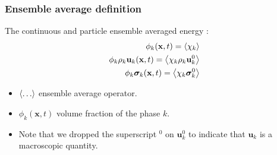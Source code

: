 \documentclass{sintefbeamer}
\begin{document}
\begin{frame}
  \frametitle{Ensemble average definition}
The continuous and particle ensemble  averaged energy : 
\begin{align*}
  \phi_k (\textbf{x},t) = \left<\chi_k \right>\\
  \phi_k \rho_k  \textbf{u}_k (\textbf{x},t) = \left<\chi_k \rho_k \textbf{u}_k^0 \right>\\
  \phi_k \bm\sigma_k (\textbf{x},t) = \left<\chi_k \bm\sigma_k^0 \right>\\
  \label{eq:1_avg}
\end{align*}
\begin{definition}
  \begin{itemize}
    \item $\left<\ldots\right>$ ensemble average operator. 
    \item  $\phi_k (\textbf{x},t)$ volume fraction of the phase $k$. 
    \item Note that we dropped the superscript $^0$ on $\textbf{u}^0_k$ to indicate that $\textbf{u}_k$ is a macroscopic quantity. 
  \end{itemize}
\end{definition}
\end{frame}
\end{document}
